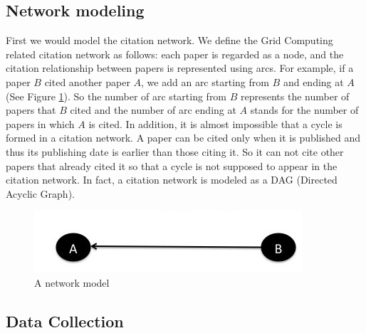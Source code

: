 \subsection{Network modeling}
First we would model the citation network. We define the Grid Computing related citation network as follows: each paper is regarded as a node, and the citation relationship between papers is represented using arcs. For example, if a paper $B$ cited another paper $A$, we add an arc starting from $B$ and ending at $A$ (See Figure \ref{F:model}).  So the number of arc starting from $B$ represents the number of papers that $B$ cited and the number of arc ending at $A$ stands for the number of papers in which $A$ is cited. In addition, it is almost impossible that a cycle is formed in a citation network. A paper can be cited only when it is published and thus its publishing date is earlier than those citing it. So it can not cite other papers that already cited it so that a cycle is not supposed to appear in the citation network. In fact, a citation network is modeled as a DAG (Directed Acyclic Graph). 

\begin{figure}[ht!]
\includegraphics [scale=0.60]{images/model.jpg}
\caption {A network model}
\label {F:model}
\end{figure}

\subsection{Data Collection}

